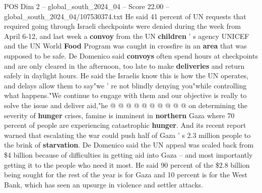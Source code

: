 \begin{textsample}{POS Dim 2 – global\_south\_2024\_04 – Score 22.00 – global\_south\_2024\_04/107530374.txt}
He said 41 percent of UN requests that required going through Israeli checkpoints were denied during the week from April 6-12, and last week a \textbf{convoy} from the UN \textbf{children} ' s agency UNICEF and the UN World \textbf{Food} Program was caught in crossfire in an \textbf{area} that was supposed to be safe.
De Domenico said \textbf{convoys} often spend hours at checkpoints and are only cleared in the afternoon, too late to make \textbf{deliveries} and return safely in daylight hours.
He said the Israelis know this is how the UN operates, and delays allow them to say"we ' re not blindly denying you"while controlling what happens."We continue to engage with them and our objective is really to solve the issue and deliver aid,"he @ @ @ @ @ @ @ @ @ @ on determining the severity of \textbf{hunger} crises, famine is imminent in \textbf{northern} Gaza where 70 percent of people are experiencing catastrophic \textbf{hunger}.
And its recent report warned that escalating the war could push half of Gaza ' s 2.3 million people to the brink of \textbf{starvation}.
De Domenico said the UN appeal was scaled back from \$4 billion because of difficulties in getting aid into Gaza -- and most importantly getting it to the people who need it most.
He said 90 percent of the \$2.8 billion being sought for the rest of the year is for Gaza and 10 percent is for the West Bank, which has seen an upsurge in violence and settler attacks.

\end{textsample}
